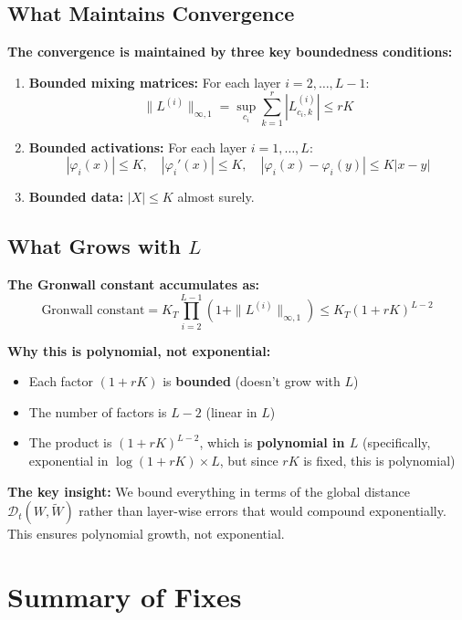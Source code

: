 \documentclass[11pt]{article}
\newcommand{\1}{\mathbbm{1}}
\begin{document}
\subsection{What Maintains Convergence}

\textbf{The convergence is maintained by three key boundedness conditions:}

\begin{enumerate}
\item \textbf{Bounded mixing matrices:} For each layer $i = 2, \ldots, L-1$:
\[
\|L^{(i)}\|_{\infty,1} = \sup_{c_i}\sum_{k=1}^r |L^{(i)}_{c_i,k}| \le rK
\]

\item \textbf{Bounded activations:} For each layer $i = 1, \ldots, L$:
\[
|\varphi_i(x)| \le K, \quad |\varphi_i'(x)| \le K, \quad |\varphi_i(x) - \varphi_i(y)| \le K|x-y|
\]

\item \textbf{Bounded data:} $|X| \le K$ almost surely.
\end{enumerate}

\subsection{What Grows with $L$}

\textbf{The Gronwall constant accumulates as:}
\[
\text{Gronwall constant} = K_T \prod_{i=2}^{L-1} (1 + \|L^{(i)}\|_{\infty,1}) \le K_T(1+rK)^{L-2}
\]

\textbf{Why this is polynomial, not exponential:}
\begin{itemize}
\item Each factor $(1+rK)$ is \textbf{bounded} (doesn't grow with $L$)
\item The number of factors is $L-2$ (linear in $L$)
\item The product is $(1+rK)^{L-2}$, which is \textbf{polynomial in $L$} (specifically, exponential in $\log(1+rK) \times L$, but since $rK$ is fixed, this is polynomial)
\end{itemize}

\textbf{The key insight:} We bound everything in terms of the global distance $\mathscr{D}_t(W, \tilde{W})$ rather than layer-wise errors that would compound exponentially. This ensures polynomial growth, not exponential.

\section{Summary of Fixes}
\end{document}
